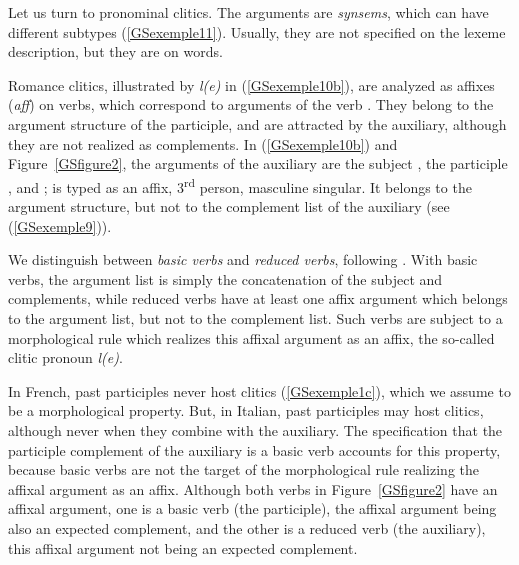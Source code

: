 \documentclass[output=paper
                ,modfonts
                ,nonflat
	        ,collection
	        ,collectionchapter
	        ,collectiontoclongg
 	        ,biblatex
                ,babelshorthands
                ,newtxmath
                ,draftmode
                ,colorlinks, citecolor=brown
]{./langsci/langscibook}
\begin{document}
{Let us turn to pronominal clitics. The arguments are \textit{synsems}, which can have different subtypes (\ref{GSexemple11}). Usually, they are not specified on the lexeme description, but they are on
words.

Romance clitics, illustrated by \textit{l(e)} in (\ref{GSexemple10b}), are analyzed as affixes (\textit{aff}) on verbs, which correspond to arguments of the verb \citep{miller1997french}. They belong to the argument structure of the participle, and are attracted by the auxiliary, although they are not realized as complements. In (\ref{GSexemple10b}) and Figure~\ref{GSfigure2}, the arguments of the auxiliary are the subject , the participle , and ;  is typed as an affix, 3\textsuperscript{rd} person, masculine singular. It belongs to the argument structure, but not to the complement list of the auxiliary (see (\ref{GSexemple9})).


We distinguish between \textit{basic verbs} and \textit{reduced verbs}, following \cite{AGS1998}. With basic verbs, the argument list is simply the concatenation of the subject and complements, while reduced verbs have at least one affix argument which belongs to the argument list, but not to the complement list. Such verbs are subject to a morphological rule which realizes this affixal argument as an affix, the so-called clitic pronoun \textit{l(e)}.

In French, past participles never host clitics (\ref{GSexemple1c}), which we assume to be a morphological property. But, in Italian, past participles may host clitics, although never when they combine
with the auxiliary. The specification that the participle complement of the auxiliary is a basic verb accounts for this property, because basic verbs are not the target of the morphological rule realizing the affixal argument as an affix. Although both verbs in Figure~\ref{GSfigure2} have an affixal argument, one is a basic verb (the participle), the affixal argument being also an expected complement, and the other is a reduced verb (the auxiliary), this affixal argument not being an expected complement.


}
\end{document}
